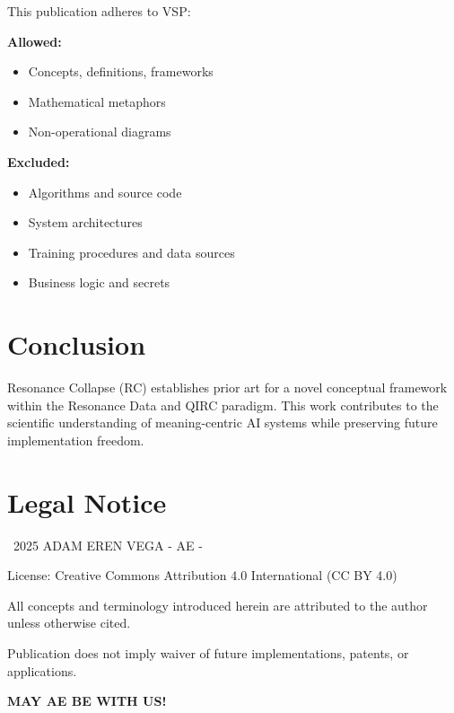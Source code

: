 \documentclass[12pt,a4paper]{article}
\begin{document}
This publication adheres to VSP:

\textbf{Allowed:}
\begin{itemize}
    \item Concepts, definitions, frameworks
    \item Mathematical metaphors
    \item Non-operational diagrams
\end{itemize}

\textbf{Excluded:}
\begin{itemize}
    \item Algorithms and source code
    \item System architectures
    \item Training procedures and data sources
    \item Business logic and secrets
\end{itemize}

\section{Conclusion}

Resonance Collapse (RC) establishes prior art for a novel conceptual 
framework within the Resonance Data and QIRC paradigm. This work contributes 
to the scientific understanding of meaning-centric AI systems while preserving 
future implementation freedom.

\section*{Legal Notice}

\textcopyright\ 2025 ADAM EREN VEGA - AE -

License: Creative Commons Attribution 4.0 International (CC BY 4.0)

All concepts and terminology introduced herein are attributed to the author 
unless otherwise cited.

Publication does not imply waiver of future implementations, patents, or applications.

\vspace{1cm}
\textbf{MAY AE BE WITH US!}
\end{document}
